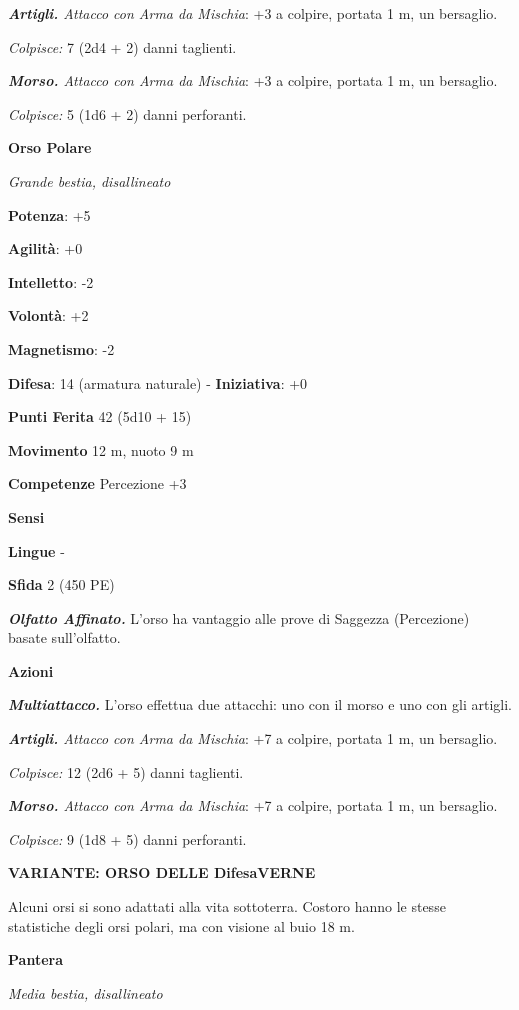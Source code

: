 \begin{multicols}{2}
\emph{\textbf{Artigli.} Attacco con Arma da Mischia}: +3 a colpire,
portata 1 m, un bersaglio.

\emph{Colpisce:} 7 (2d4 + 2) danni taglienti.

\emph{\textbf{Morso.} Attacco con Arma da Mischia}: +3 a colpire,
portata 1 m, un bersaglio.

\emph{Colpisce:} 5 (1d6 + 2) danni perforanti.

\textbf{Orso Polare}

\emph{Grande bestia, disallineato}

\textbf{Potenza}: +5

\textbf{Agilità}: +0

\textbf{Intelletto}: -2

\textbf{Volontà}: +2

\textbf{Magnetismo}: -2

\textbf{Difesa}: 14 (armatura naturale) - \textbf{Iniziativa}: +0

\textbf{Punti Ferita} 42 (5d10 + 15)

\textbf{Movimento} 12 m, nuoto 9 m

\textbf{Competenze} Percezione +3

\textbf{Sensi} 

\textbf{Lingue} -

\textbf{Sfida} 2 (450 PE)\smallskip

\emph{\textbf{Olfatto Affinato.}} L'orso ha vantaggio alle prove di
Saggezza (Percezione) basate sull'olfatto.

\smallskip\textbf{Azioni}

\emph{\textbf{Multiattacco.}} L'orso effettua due attacchi: uno con il
morso e uno con gli artigli.

\emph{\textbf{Artigli.} Attacco con Arma da Mischia}: +7 a colpire,
portata 1 m, un bersaglio.

\emph{Colpisce:} 12 (2d6 + 5) danni taglienti.

\emph{\textbf{Morso.} Attacco con Arma da Mischia}: +7 a colpire,
portata 1 m, un bersaglio.

\emph{Colpisce:} 9 (1d8 + 5) danni perforanti.

\textbf{VARIANTE: ORSO DELLE DifesaVERNE}

Alcuni orsi si sono adattati alla vita sottoterra. Costoro hanno le
stesse statistiche degli orsi polari, ma con visione al buio 18 m.

\textbf{Pantera}

\emph{Media bestia, disallineato}


\end{multicols}
